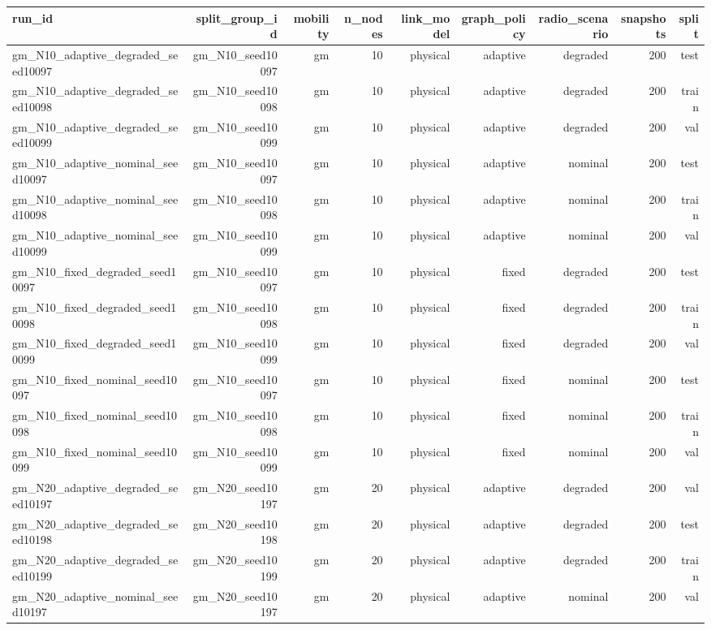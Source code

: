 \begin{tabular}{lrrrrrrrr}
\toprule
run\_id & split\_group\_id & mobility & n\_nodes & link\_model & graph\_policy & radio\_scenario & snapshots & split \\
\midrule
gm\_N10\_adaptive\_degraded\_seed10097 & gm\_N10\_seed10097 & gm & 10 & physical & adaptive & degraded & 200 & test \\
gm\_N10\_adaptive\_degraded\_seed10098 & gm\_N10\_seed10098 & gm & 10 & physical & adaptive & degraded & 200 & train \\
gm\_N10\_adaptive\_degraded\_seed10099 & gm\_N10\_seed10099 & gm & 10 & physical & adaptive & degraded & 200 & val \\
gm\_N10\_adaptive\_nominal\_seed10097 & gm\_N10\_seed10097 & gm & 10 & physical & adaptive & nominal & 200 & test \\
gm\_N10\_adaptive\_nominal\_seed10098 & gm\_N10\_seed10098 & gm & 10 & physical & adaptive & nominal & 200 & train \\
gm\_N10\_adaptive\_nominal\_seed10099 & gm\_N10\_seed10099 & gm & 10 & physical & adaptive & nominal & 200 & val \\
gm\_N10\_fixed\_degraded\_seed10097 & gm\_N10\_seed10097 & gm & 10 & physical & fixed & degraded & 200 & test \\
gm\_N10\_fixed\_degraded\_seed10098 & gm\_N10\_seed10098 & gm & 10 & physical & fixed & degraded & 200 & train \\
gm\_N10\_fixed\_degraded\_seed10099 & gm\_N10\_seed10099 & gm & 10 & physical & fixed & degraded & 200 & val \\
gm\_N10\_fixed\_nominal\_seed10097 & gm\_N10\_seed10097 & gm & 10 & physical & fixed & nominal & 200 & test \\
gm\_N10\_fixed\_nominal\_seed10098 & gm\_N10\_seed10098 & gm & 10 & physical & fixed & nominal & 200 & train \\
gm\_N10\_fixed\_nominal\_seed10099 & gm\_N10\_seed10099 & gm & 10 & physical & fixed & nominal & 200 & val \\
gm\_N20\_adaptive\_degraded\_seed10197 & gm\_N20\_seed10197 & gm & 20 & physical & adaptive & degraded & 200 & val \\
gm\_N20\_adaptive\_degraded\_seed10198 & gm\_N20\_seed10198 & gm & 20 & physical & adaptive & degraded & 200 & test \\
gm\_N20\_adaptive\_degraded\_seed10199 & gm\_N20\_seed10199 & gm & 20 & physical & adaptive & degraded & 200 & train \\
gm\_N20\_adaptive\_nominal\_seed10197 & gm\_N20\_seed10197 & gm & 20 & physical & adaptive & nominal & 200 & val \\

\end{tabular}
